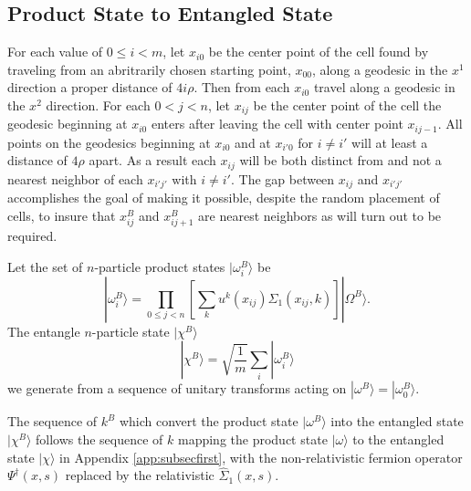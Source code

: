 \documentclass[12pt,amsmath,amssymb,onecolumn]{revtex4-2}
\begin{document}
\subsection{\label{app:subsecfirstr} Product State to Entangled State}

For each value of $0 \le i < m$, let $x_{i0}$ be the center point of the cell found
by traveling from an abritrarily chosen starting point, $x_{00}$, along a geodesic in the $x^1$ direction a proper
distance of $4 i \rho$. Then from each $x_{i0}$ travel along a geodesic
in the $x^2$ direction. For each $0 < j < n$, let $x_{ij}$ be the
center point of the cell the geodesic beginning at $x_{i0}$ enters after leaving the
cell with center point $x_{ij-1}$. All points on the geodesics beginning at $x_{i0}$
and at $x_{i'0}$ for $i \ne i'$ will at least a distance of $4 \rho$ apart.
As a result each $x_{ij}$ will be both distinct from and not
a nearest neighbor of each $x_{i'j'}$ with $i \ne i'$.
The gap between  $x_{ij}$ and  $x_{i'j'}$ accomplishes the goal
of making it possible,
despite the random placement of cells, to insure that $x^B_{ij}$ and $x^B_{ij+1}$
are nearest neighbors as will turn out to be required.


Let the set of $n$-particle product states $|\omega^B_i \rangle $ be
\begin{equation}
\label{defomega1}
|\omega^B_i \rangle   =  \prod_{0 \le j < n} [ \sum_k u^k(x_{ij}) \Sigma_1( x_{ij}, k)] |\Omega^B \rangle .
\end{equation}
The entangle $n$-particle state $|\chi^B \rangle $
\begin{equation}
\label{defchi1}
|\chi^B \rangle  = \sqrt{\frac{1}{m}} \sum_i |\omega^B_i \rangle 
\end{equation}
we generate from a sequence of unitary transforms acting
on $|\omega^B \rangle  = |\omega^B_0 \rangle $.

The sequence of $k^B$ which convert the product state $|\omega^B \rangle $
into  the entangled state $|\chi^B \rangle $ follows
the sequence of $k$ mapping the product state $|\omega \rangle $ to the entangled
state $|\chi \rangle $
in Appendix \ref{app:subsecfirst},  with
the non-relativistic fermion operator $\Psi^\dagger( x, s)$ replaced
by the relativistic $\hat{\Sigma}_1( x, s)$.
\end{document}
